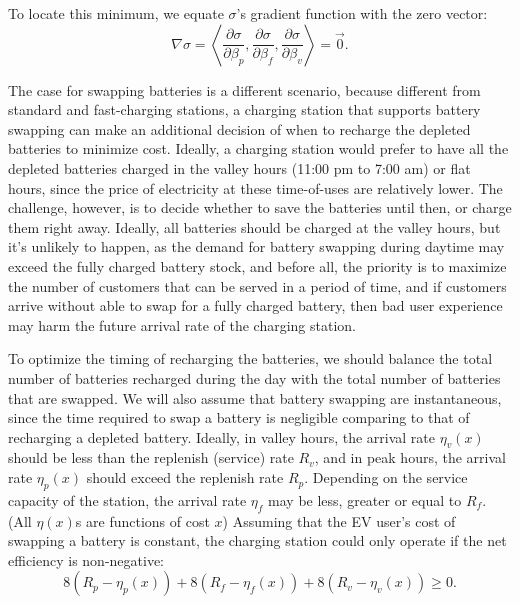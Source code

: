 \documentclass[10pt]{article}
\begin{document}
To locate this minimum, we equate $\sigma$'s gradient function with the zero vector:
\begin{equation}
    \nabla \sigma = \left<\frac{\partial \sigma}{\partial \beta_p},\frac{\partial \sigma}{\partial \beta_f},\frac{\partial \sigma}{\partial \beta_v}\right> = \vec{0}.
\end{equation}

The case for swapping batteries is a different scenario, because different from standard and fast-charging stations, a charging station that supports battery swapping can make an additional decision of when to recharge the depleted batteries to minimize cost. Ideally, a charging station would prefer to have all the depleted batteries charged in the valley hours (11:00 pm to 7:00 am) or flat hours, since the price of electricity at these time-of-uses are relatively lower. The challenge, however, is to decide whether to save the batteries until then, or charge them right away. Ideally, all batteries should be charged at the valley hours, but it's unlikely to happen, as the demand for battery swapping during daytime may exceed the fully charged battery stock, and before all, the priority is to maximize the number of customers that can be served in a period of time, and if customers arrive without able to swap for a fully charged battery, then bad user experience may harm the future arrival rate of the charging station.

To optimize the timing of recharging the batteries, we should balance the total number of batteries recharged during the day with the total number of batteries that are swapped. We will also assume that battery swapping are instantaneous, since the time required to swap a battery is negligible comparing to that of recharging a depleted battery. Ideally, in valley hours, the arrival rate $\eta_v(x)$ should be less than the replenish (service) rate $R_v$, and in peak hours, the arrival rate $\eta_p(x)$ should exceed the replenish rate $R_p$. Depending on the service capacity of the station, the arrival rate $\eta_f$ may be less, greater or equal to $R_f$. (All $\eta(x)$s are functions of cost $x$) Assuming that the EV user's cost of swapping a battery is constant, the charging station could only operate if the net efficiency is non-negative: 
\begin{equation}\label{eq:inequality}
    8 (R_p - \eta_p(x)) + 8 (R_f - \eta_f(x)) + 8(R_v - \eta_v(x)) \ge 0.
\end{equation}
\end{document}

